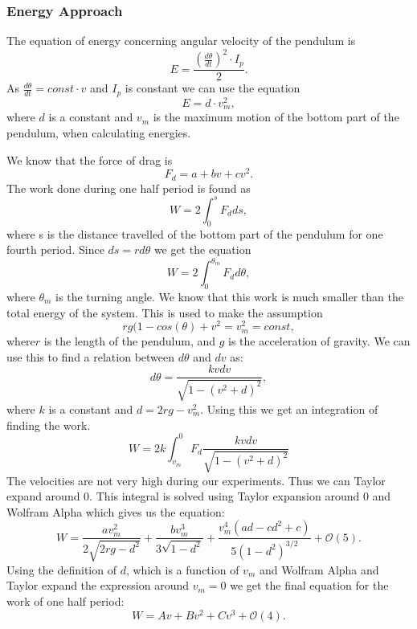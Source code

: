 ﻿\documentclass[11pt, a4paper]{article}
\begin{document}
\subsubsection{Energy Approach}
The equation of energy concerning angular velocity of the pendulum is
\[
	E = \frac{(\frac{d\theta}{dt})^2\cdot I_p }{2}.
\]
As $\frac{d\theta}{dt} = const\cdot v$ and $I_p$ is constant we can use the equation
\[
	E = d\cdot v_m^2,
\]
where $d$ is a constant and $v_m$ is the maximum motion of the bottom part of the pendulum, when calculating energies.

We know that the force of drag is
\[
	F_d = a + bv + cv^2.
\]
The work done during one half period is found as
\[
	W = 2\int_0^s{F_d ds},
\]
where s is the distance travelled of the bottom part of the pendulum for one fourth period.
Since $ds = rd\theta$ we get the equation
\[
	W = 2\int_0^{\theta_m}{F_d d\theta},
\]
where $\theta_m$ is the turning angle.
We know that this work is much smaller than the total energy of the system. This is used to make the assumption 
\[
	rg(1-cos(\theta) + v^2 = v_m^2 = const,
\]
where$ r$ is the length of the pendulum, and $g$ is the acceleration of gravity.
We can use this to find a relation between $d\theta$ and $dv$ as:
\[
	d\theta = \frac{kvdv}{\sqrt{1-(v^2+d)^2}},
\]
where $k$ is a constant and $d = 2rg - v_{m}^{2}$.
Using this we get an integration of finding the work.
\[
	W = 2k\int_{v_m}^0 F_d \frac{kvdv}{\sqrt{1-(v^2+d)^2}}
\]
The velocities are not very high during our experiments. Thus we can Taylor expand around 0.
This integral is solved using Taylor expansion around 0 and Wolfram Alpha which gives us the equation:
\[
	W = \frac{av_{m}^{2}}{2\sqrt{2rg-d^2}} + \frac{bv_{m}^{3}}{3\sqrt{1-d^2}} + \frac{v_{m}^{4} (ad-cd^2+c)}{5(1-d^2)^{3/2}} + \mathcal{O}(5).
\]
Using the definition of $d$, which is a function of $v_m$ and Wolfram Alpha and Taylor expand the expression around $v_m=0$ we get the final equation for the work of one half period:
\[
	W = Av + Bv^2 + Cv^3 +  \mathcal{O}(4).
\]
\end{document}
